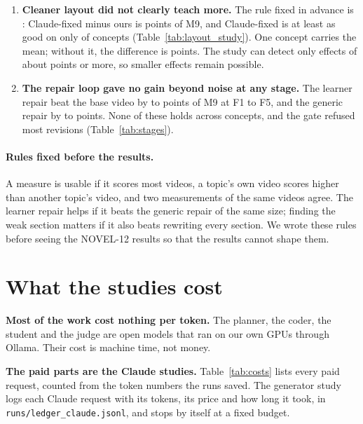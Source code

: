 \documentclass[11pt]{article}
\begin{document}
\begin{enumerate}
  Claude's notes name a shift our layout repair inserted as the cause of \ShiftNotes{} faults; the broken
  attachments our check can count come from the coder's placement, not from the shifts (Section~\ref{sec:quality}).
  \item \textbf{Cleaner layout did not clearly teach more.} The rule fixed in advance is \LSGate{}: Claude-fixed minus
  ours is \LSDiff{} points of M9, and Claude-fixed is at least as good on only \LSWins{} of \LSN{} concepts
  (Table~\ref{tab:layout_study}). One concept carries the mean; without it, the difference is \LSDiffWithoutTop{}
  points. The study can detect only effects of about \NMLayoutMDE{} points or more, so smaller effects remain
  possible.
  \item \textbf{The repair loop gave no gain beyond noise at any stage.} The learner repair beat the base video by
  \NMStageFour{} to \NMStageTwo{} points of M9 at F1 to F5, and the generic repair by \NMStageFourGeneric{} to
  \NMStageFiveGeneric{} points. None of these holds across concepts, and the gate refused most revisions
  (Table~\ref{tab:stages}).
\end{enumerate}

\paragraph{Rules fixed before the results.} A measure is usable if it scores most videos, a topic's own video
scores higher than another topic's video, and two measurements of the same videos agree. The learner repair helps if
it beats the generic repair of the same size; finding the weak section matters if it also beats rewriting every
section. We wrote these rules before seeing the NOVEL-12 results so that the results cannot shape them.

\section{What the studies cost}\label{sec:costs}

\textbf{Most of the work cost nothing per token.} The planner, the coder, the student and the judge are open models
that ran on our own GPUs through Ollama. Their cost is machine time, not money.

\textbf{The paid parts are the Claude studies.} Table~\ref{tab:costs} lists every paid request, counted from the
token numbers the runs saved. The generator study logs each Claude request with its tokens, its price and how long it
took, in \texttt{runs/ledger\_claude.jsonl}, and stops by itself at a fixed budget.
\end{document}
